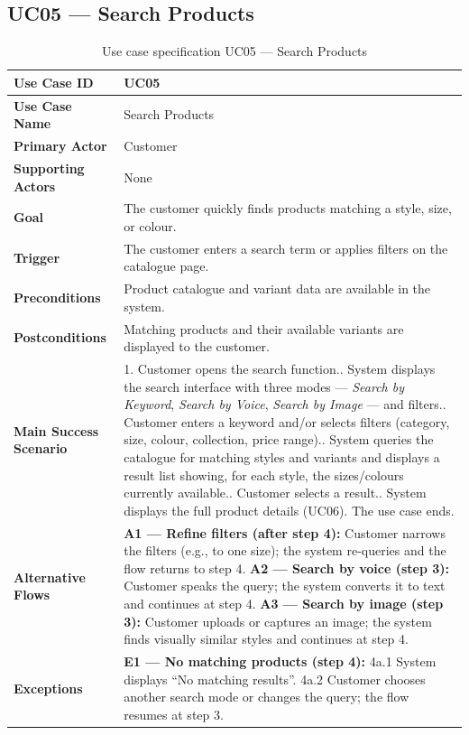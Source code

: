 \documentclass[11pt,a4paper,oneside]{extreport}
\newcommand{\ucrow}[2]{\textbf{#1} & #2 \\ \midrule}
\begin{document}
\subsection{UC05 --- Search Products}
{\small
\begin{xltabular}{\textwidth}{@{}L{3.1cm} Y@{}}
\caption{Use case specification UC05 --- Search Products}\label{tab:uc05}\\
\toprule
\endfirsthead
\toprule
\endhead
\bottomrule
\endlastfoot
\ucrow{Use Case ID}{UC05}
\ucrow{Use Case Name}{Search Products}
\ucrow{Primary Actor}{Customer}
\ucrow{Supporting Actors}{None}
\ucrow{Goal}{The customer quickly finds products matching a style, size, or colour.}
\ucrow{Trigger}{The customer enters a search term or applies filters on the catalogue page.}
\ucrow{Preconditions}{Product catalogue and variant data are available in the system.}
\ucrow{Postconditions}{Matching products and their available variants are displayed to the customer.}
\ucrow{Main Success Scenario}{%
1. Customer opens the search function.\newline
2. System displays the search interface with three modes --- \emph{Search by Keyword}, \emph{Search by Voice}, \emph{Search by Image} --- and filters.\newline
3. Customer enters a keyword and/or selects filters (category, size, colour, collection, price range).\newline
4. System queries the catalogue for matching styles and variants and displays a result list showing, for each style, the sizes/colours currently available.\newline
5. Customer selects a result.\newline
6. System displays the full product details (UC06). The use case ends.}
\ucrow{Alternative Flows}{%
\textbf{A1 --- Refine filters (after step 4):} Customer narrows the filters (e.g., to one size); the system re-queries and the flow returns to step 4.\newline
\textbf{A2 --- Search by voice (step 3):} Customer speaks the query; the system converts it to text and continues at step 4.\newline
\textbf{A3 --- Search by image (step 3):} Customer uploads or captures an image; the system finds visually similar styles and continues at step 4.}
\ucrow{Exceptions}{%
\textbf{E1 --- No matching products (step 4):}\newline
4a.1 System displays ``No matching results''.\newline
4a.2 Customer chooses another search mode or changes the query; the flow resumes at step 3.\newline
}
\end{xltabular}}
\end{document}

